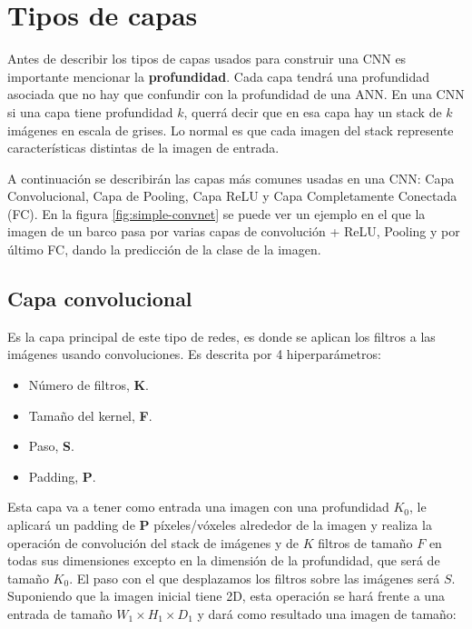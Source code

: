 \section{Tipos de capas}\label{cnn_capas}

Antes de describir los tipos de capas usados para construir una  CNN es importante mencionar la \textbf{profundidad}. Cada capa tendrá una profundidad asociada que no hay que confundir con la profundidad de una ANN. En una CNN si una capa tiene profundidad $k$, querrá decir que en esa capa hay un stack de $k$ imágenes en escala de grises. Lo normal es que cada imagen del stack represente características distintas de la imagen de entrada.

A continuación se describirán las capas más comunes usadas en una CNN: Capa Convolucional, Capa de Pooling, Capa ReLU y Capa Completamente Conectada (FC). En la figura \ref{fig:simple-convnet} \cite{missinglink2020} se puede ver un ejemplo en el que la imagen de un barco pasa por varias capas de convolución + ReLU, Pooling y por último FC, dando la predicción de la clase de la imagen.


\subsection{Capa convolucional}\label{cnn_capa_conv}

Es la capa principal de este tipo de redes, es donde se aplican los filtros a las imágenes usando convoluciones. Es descrita por 4 hiperparámetros:

\begin{itemize}
\item Número de filtros, \textbf{K}.
\item Tamaño del kernel, \textbf{F}.
\item Paso, \textbf{S}.
\item Padding, \textbf{P}.
\end{itemize}

Esta capa va a tener como entrada una imagen con una profundidad $K_0$, le aplicará un padding de \textbf{P} píxeles/vóxeles alrededor de la imagen y realiza la operación de convolución del stack de imágenes y de $K$ filtros de tamaño $F$ en todas sus dimensiones excepto en la dimensión de la profundidad, que será de tamaño $K_0$. El paso con el que desplazamos los filtros sobre las imágenes será $S$. Suponiendo que la imagen inicial tiene 2D, esta operación se hará frente a una entrada de tamaño $W_1 \times H_1 \times D_1$ y dará como resultado una imagen de tamaño:

